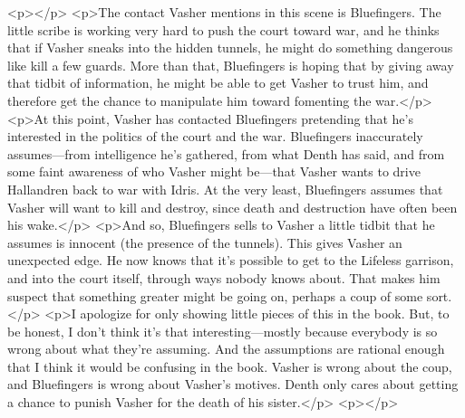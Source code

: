<p></p>
<p>The contact Vasher mentions in this scene is Bluefingers. The little scribe is working very hard to push the court toward war, and he thinks that if Vasher sneaks into the hidden tunnels, he might do something dangerous like kill a few guards. More than that, Bluefingers is hoping that by giving away that tidbit of information, he might be able to get Vasher to trust him, and therefore get the chance to manipulate him toward fomenting the war.</p>
<p>At this point, Vasher has contacted Bluefingers pretending that he’s interested in the politics of the court and the war. Bluefingers inaccurately assumes—from intelligence he’s gathered, from what Denth has said, and from some faint awareness of who Vasher might be—that Vasher wants to drive Hallandren back to war with Idris. At the very least, Bluefingers assumes that Vasher will want to kill and destroy, since death and destruction have often been his wake.</p>
<p>And so, Bluefingers sells to Vasher a little tidbit that he assumes is innocent (the presence of the tunnels). This gives Vasher an unexpected edge. He now knows that it’s possible to get to the Lifeless garrison, and into the court itself, through ways nobody knows about. That makes him suspect that something greater might be going on, perhaps a coup of some sort.</p>
<p>I apologize for only showing little pieces of this in the book. But, to be honest, I don’t think it’s that interesting—mostly because everybody is so wrong about what they’re assuming. And the assumptions are rational enough that I think it would be confusing in the book. Vasher is wrong about the coup, and Bluefingers is wrong about Vasher’s motives. Denth only cares about getting a chance to punish Vasher for the death of his sister.</p>
<p></p>



